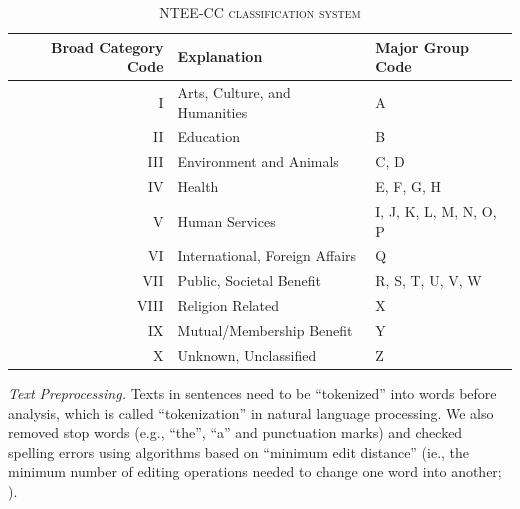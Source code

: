 \documentclass[11pt]{article}
\begin{document}
\begin{table}[]
    \centering
    \begin{tabularx}{\textwidth}{r|X|X}
    	 \hline
         Broad Category Code & Explanation & Major Group Code \\
         \hline
		I & Arts, Culture, and Humanities & A \\
		II & Education & B \\
		III & Environment and Animals & C, D \\
		IV & Health & E, F, G, H \\
		V & Human Services & I, J, K, L, M, N, O, P \\
		VI & International, Foreign Affairs & Q \\
		VII & Public, Societal Benefit & R, S, T, U, V, W \\
		VIII & Religion Related & X \\
		IX & Mutual/Membership Benefit & Y \\
		X & Unknown, Unclassified & Z \\
         \hline
    \end{tabularx}
    \caption{\textsc{NTEE-CC classification system}} \label{tab:classification}
\end{table}


\textit{Text Preprocessing.} Texts in sentences need to be ``tokenized'' into words before analysis, which is called ``tokenization'' in natural language processing. We also removed stop words (e.g., ``the'', ``a'' and punctuation marks) and checked spelling errors using algorithms based on ``minimum edit distance'' (ie., the minimum number of editing operations needed to change one word into another; \textcite[26]{JurafskySpeechLanguageProcessing2017}).


\end{document}
